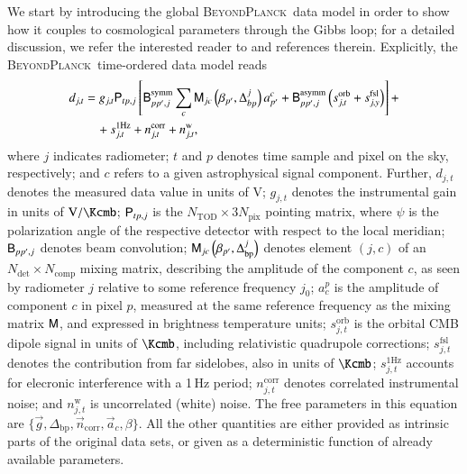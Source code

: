 \documentclass[onecolumn]{aa}
\newcommand{\n}[0]{\vec{n}}
\renewcommand{\a}[0]{\vec{a}}
\newcommand{\B}[0]{\tens{B}}
\newcommand{\g}[0]{\vec{g}}
\newcommand{\M}[0]{\tens{M}}
\renewcommand{\P}[0]{\tens{P}}
\newcommand{\BP}{\textsc{BeyondPlanck}}
\begin{document}
We start by introducing the global \BP\ data model in order to
show how it couples to cosmological parameters through the Gibbs loop;
for a detailed discussion, we refer the interested reader to
\citet{bp01} and references therein. Explicitly, the \BP\ time-ordered
data model reads
\begin{equation}
  \label{eq:data_model}
  \begin{split}
  d_{j,t} &= g_{j,t}{\P}_{tp,j}\left[ {\B}_{pp',j}^{\mathrm{symm}} \sum_c 
  {\M}_{jc}\left(\beta_{p'},\Delta_{bp}^j\right) a_{p'}^c +{\B}_{pp',j}^{\mathrm{asymm}}
  \left(s_{j,t}^{\mathrm{orb}}+s_{j,y}^{\mathrm{fsl}}\right)\right] + \\
  & \quad + s_{j,t}^{\mathrm{1Hz}} + n_{j,t}^{\mathrm{corr}}+n_{j,t}^{\mathrm{w}},
  \end{split}
\end{equation}
where $j$ indicates radiometer; $t$ and $p$ denotes time sample and
pixel on the sky, respectively; and $c$ refers to a given
astrophysical signal component. Further, $d_{j,t}$ denotes the
measured data value in units of $\si{\volt}$; $g_{j,t}$ denotes the
instrumental gain in units of $\si{\volt\per\Kcmb}$; $\P_{tp,j}$ is
the $N_{\mathrm{TOD}}\times 3N_{\mathrm{pix}}$ pointing matrix, where
$\psi$ is the polarization angle of the respective detector with
respect to the local meridian; $\B_{pp',j}$ denotes beam convolution;
$\M_{jc}\left(\beta_{p'},\Delta_{\mathrm{bp}}^j\right)$ denotes
element $(j,c)$ of an $N_{\mathrm{det}}\times N_{\mathrm{comp}}$
mixing matrix, describing the amplitude of the component $c$, as seen
by radiometer $j$ relative to some reference frequency $j_0$; $a_c^p$
is the amplitude of component $c$ in pixel $p$, measured at the same
reference frequency as the mixing matrix $\M$, and expressed in
brightness temperature units; $s_{j,t}^{\mathrm{orb}}$ is the orbital
CMB dipole signal in units of $\si{\Kcmb}$, including relativistic
quadrupole corrections; $s_{j,t}^{\mathrm{fsl}}$ denotes the
contribution from far sidelobes, also in units of $\si{\Kcmb}$;
$s_{j,t}^{\mathrm{1Hz}}$ accounts for elecronic interference with a
1\,Hz period; $n_{j,t}^{\mathrm{corr}}$ denotes correlated
instrumental noise; and $n_{j,t}^{\mathrm{w}}$ is uncorrelated (white)
noise. The free parameters in this equation are
$\lbrace\g,\Delta_{\mathrm{bp}},\n_{\mathrm{corr}},\a_c,\beta\rbrace$. All
the other quantities are either provided as intrinsic parts of the
original data sets, or given as a deterministic function of already
available parameters.
\end{document}
